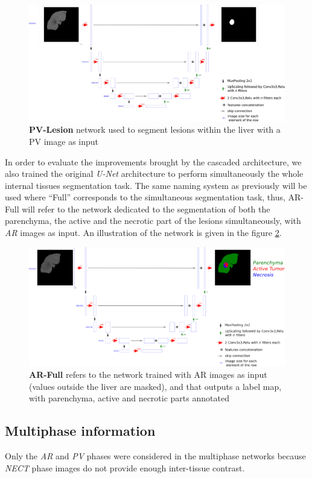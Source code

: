 \documentclass[]{article}
\newcommand{\pplfont}[1]{{\textbf{\fontfamily{ppl}\selectfont #1}}}
\begin{document}
\begin{figure}[th!]
	\centering
	\includegraphics[width=0.7\linewidth]{images/image16}
	\caption{\pplfont{PV-Lesion} network used to segment lesions within the liver with a PV image as input}
	\label{CARS_PV_lesion_Fig}
\end{figure}


In order to evaluate the improvements brought by the cascaded
architecture, we also trained the original \emph{U-Net} architecture to
perform simultaneously the whole internal tissues segmentation task. The
same naming system as previously will be used where ``Full'' corresponds
to the simultaneous segmentation task, thus, AR-Full will refer to the
network dedicated to the segmentation of both the parenchyma, the active
and the necrotic part of the lesions simultaneously, with \emph{AR}
images as input. An illustration of the network is given in the figure
\ref{CARS_ArFull_Fig}.

\begin{figure}[th!]
	\centering
	\includegraphics[width=0.7\linewidth]{images/image23}
	\caption{\pplfont{AR-Full} refers to the network trained with AR images as input (values outside the liver are masked), and that outputs a label map, with parenchyma, active and necrotic parts annotated}
	\label{CARS_ArFull_Fig}
\end{figure}


\subsection*{Multiphase information}

Only the \emph{AR} and \emph{PV} phases were considered in the
multiphase networks because \emph{NECT} phase images do not provide enough
inter-tissue contrast.
\end{document}
